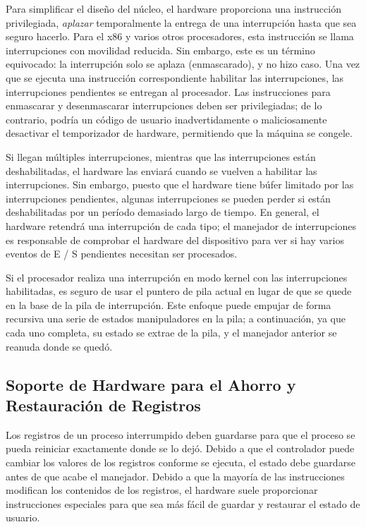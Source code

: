 \documentclass[10pt]{book}
\begin{document}
Para simplificar el diseño del núcleo, el hardware proporciona una instrucción privilegiada, \textit{aplazar} temporalmente la entrega de una interrupción hasta que sea seguro hacerlo. Para el x$86$ y varios otros procesadores, esta instrucción se llama interrupciones con movilidad reducida. Sin embargo, este es un término equivocado: la interrupción solo se aplaza (enmascarado), y no hizo caso. Una vez que se ejecuta una instrucción correspondiente habilitar las interrupciones, las interrupciones pendientes se entregan al procesador. Las instrucciones para enmascarar y desenmascarar interrupciones deben ser privilegiadas; de lo contrario, podría un código de usuario inadvertidamente o maliciosamente desactivar el temporizador de hardware, permitiendo que la máquina se congele.

Si llegan múltiples interrupciones, mientras que las interrupciones están deshabilitadas, el hardware las enviará cuando se vuelven a habilitar las interrupciones. Sin embargo, puesto que el hardware tiene búfer limitado por las interrupciones pendientes, algunas interrupciones se pueden perder si están deshabilitadas por un período demasiado largo de tiempo. En general, el hardware retendrá una interrupción de cada tipo; el manejador de interrupciones es responsable de comprobar el hardware del dispositivo para ver si hay varios eventos de E / S pendientes necesitan ser procesados.

Si el procesador realiza una interrupción en modo kernel con las interrupciones habilitadas, es seguro de usar el puntero de pila actual en lugar de que se quede en la base de la pila de interrupción. Este enfoque puede empujar de forma recursiva una serie de estados manipuladores en la pila; a continuación, ya que cada uno completa, su estado se extrae de la pila, y el manejador anterior se reanuda donde se quedó.

\subsection{Soporte de Hardware para el Ahorro y Restauración de Registros}
Los registros de un proceso interrumpido deben guardarse para que el proceso se pueda reiniciar exactamente donde se lo dejó. Debido a que el controlador puede cambiar los valores de los registros conforme se ejecuta, el estado debe guardarse antes de que acabe el manejador. Debido a que la mayoría de las instrucciones modifican los contenidos de los registros, el hardware suele proporcionar instrucciones especiales para que sea más fácil de guardar y restaurar el estado de usuario.
\end{document}
